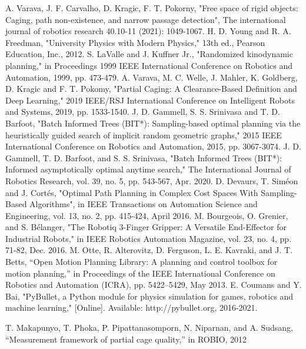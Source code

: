 \documentclass[conference]{IEEEtran}
\begin{document}
\begin{thebibliography}{00}
	 A. Varava, J. F. Carvalho, D. Kragic, F. T.  Pokorny, "Free space of rigid objects: Caging, path non-existence, and narrow passage detection", The international journal of robotics research 40.10-11 (2021): 1049-1067.
	 H. D. Young and R. A. Freedman, "University Physics with Modern Physics," 13th ed., Pearson Education, Inc., 2012.
	 S. LaValle and J. Kuffner Jr., "Randomized kinodynamic planning," in Proceedings 1999 IEEE International Conference on Robotics and Automation, 1999, pp. 473-479.
	 A. Varava, M. C. Welle, J. Mahler, K. Goldberg, D. Kragic and F. T. Pokomy, "Partial Caging: A Clearance-Based Definition and Deep Learning," 2019 IEEE/RSJ International Conference on Intelligent Robots and Systems, 2019, pp. 1533-1540.
	 J. D. Gammell, S. S. Srinivasa and T. D. Barfoot, "Batch Informed Trees (BIT*): Sampling-based optimal planning via the heuristically guided search of implicit random geometric graphs," 2015 IEEE International Conference on Robotics and Automation, 2015, pp. 3067-3074.
	 J. D. Gammell, T. D. Barfoot, and S. S. Srinivasa, "Batch Informed Trees (BIT*): Informed asymptotically optimal anytime search," The International Journal of Robotics Research, vol. 39, no. 5, pp. 543-567, Apr. 2020.
	 D. Devaurs, T. Siméon and J. Cortés, "Optimal Path Planning in Complex Cost Spaces With Sampling-Based Algorithms", in IEEE Transactions on Automation Science and Engineering, vol. 13, no. 2, pp. 415-424, April 2016.
	 M. Bourgeois, O. Grenier, and S. Bélanger, "The Robotiq 3-Finger Gripper: A Versatile End-Effector for Industrial Robots," in IEEE Robotics Automation Magazine, vol. 23, no. 4, pp. 71-82, Dec. 2016.
	 M. Otte, R. Alterovitz, D. Ferguson, L. E. Kavraki, and J. T. Betts, “Open Motion Planning Library: A planning and control toolbox for motion planning,” in Proceedings of the IEEE International Conference on Robotics and Automation (ICRA), pp. 5422–5429, May 2013.
	 E. Coumans and Y. Bai, "PyBullet, a Python module for physics simulation for games, robotics and machine learning," [Online]. Available: http://pybullet.org, 2016-2021.
	
	 T. Makapunyo, T. Phoka, P. Pipattanasomporn, N. Niparnan, and A. Sudsang, “Measurement framework of partial cage quality,” in ROBIO, 2012
	
	
	
	
\end{thebibliography}
\vspace{12pt}
\color{red}
\end{document}
